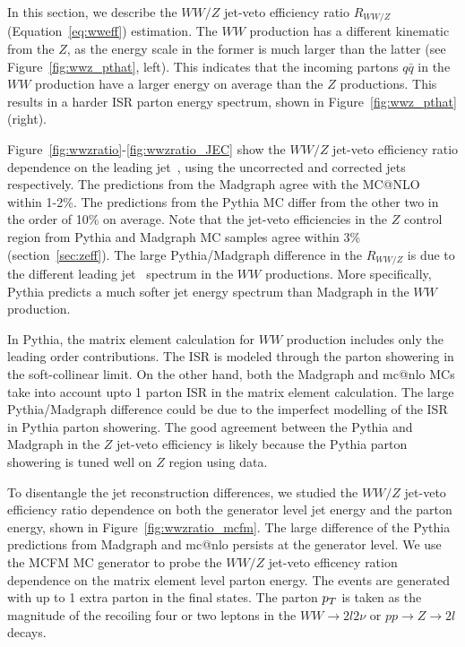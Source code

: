 In this section, we describe the $WW/Z$ jet-veto efficiency 
ratio $R_{WW/Z}$ (Equation~\ref{eq:wweff}) estimation. 
The $WW$ production has a different kinematic from the $Z$, as 
the energy scale in the former is much larger than the latter 
(see Figure~\ref{fig:wwz_pthat}, left).
This indicates that the incoming partons $q\bar{q}$ in the $WW$ 
production have a larger energy on average than the $Z$ productions. 
This results in a harder ISR parton energy spectrum, 
shown in Figure~\ref{fig:wwz_pthat} (right). 


Figure~\ref{fig:wwzratio}-\ref{fig:wwzratio_JEC} show 
the $WW/Z$ jet-veto efficiency ratio dependence on the 
leading jet \pt\,, using the uncorrected and corrected jets respectively. 
The predictions from the Madgraph agree with the MC@NLO within 1-2\%.
The predictions from the Pythia MC differ from the 
other two in the order of 10\% on average. 
Note that the jet-veto efficiencies in the $Z$ control region 
from Pythia and Madgraph MC samples agree within 3\% (section~\ref{sec:zeff}). 
The large Pythia/Madgraph difference in the $R_{WW/Z}$ 
is due to the different leading jet \pt\, spectrum in the 
$WW$ productions. 
More specifically, Pythia predicts a much softer 
jet energy spectrum than Madgraph in the $WW$ production. 

In Pythia, the matrix element calculation for $WW$ production 
includes only the leading order contributions. 
The ISR is modeled through the parton 
showering in the soft-collinear limit. 
On the other hand, both the Madgraph and mc@nlo MCs 
take into account upto 1 parton ISR in the matrix element calculation.
The large Pythia/Madgraph difference could be due to the 
imperfect modelling of the ISR in Pythia parton showering. 
The good agreement between the Pythia and Madgraph in the 
$Z$ jet-veto efficiency is likely because the Pythia parton 
showering is tuned well on $Z$ region using data. 


To disentangle the jet reconstruction differences, we studied the 
$WW/Z$ jet-veto efficiency ratio dependence on both the generator level 
jet energy and the parton energy, shown in Figure~\ref{fig:wwzratio_mcfm}. 
The large difference of the Pythia predictions from Madgraph and mc@nlo 
persists at the generator level. 
We use the MCFM\cite{ref:mcfm} MC generator to probe the $WW/Z$ jet-veto 
efficency ration dependence on the matrix element level parton energy. 
The events are generated with up to 1 extra parton in the final states. 
The parton $p_T$ is taken as the magnitude of the recoiling four or two 
leptons \pt in the $WW\to 2l2\nu$ or $pp\to Z\to 2l$ decays. 


